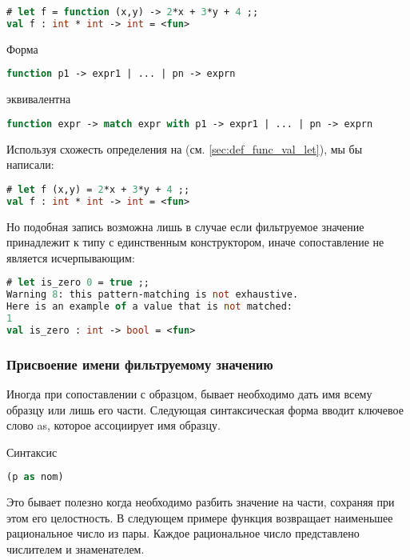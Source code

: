\begin{lstlisting}[language=OCaml]
# let f = function (x,y) -> 2*x + 3*y + 4 ;;
val f : int * int -> int = <fun>
\end{lstlisting}

Форма

\begin{lstlisting}[language=OCaml]
 function p1 -> expr1 | ... | pn -> exprn 
\end{lstlisting}

эквивалентна

\begin{lstlisting}[language=OCaml]
function expr -> match expr with p1 -> expr1 | ... | pn -> exprn
\end{lstlisting}

Используя схожесть определения на (см. \ref{sec:def_func_val_let}), мы бы
написали:

\begin{lstlisting}[language=OCaml]
# let f (x,y) = 2*x + 3*y + 4 ;;
val f : int * int -> int = <fun>
\end{lstlisting}

Но подобная запись возможна лишь в случае если фильтруемое значение принадлежит
к типу с единственным конструктором, иначе сопоставление не является
исчерпывающим:

\begin{lstlisting}[language=OCaml]
# let is_zero 0 = true ;;
Warning 8: this pattern-matching is not exhaustive.
Here is an example of a value that is not matched:
1
val is_zero : int -> bool = <fun>
\end{lstlisting}

\subsubsection{Присвоение имени фильтруемому значению}

Иногда при сопоставлении с образцом, бывает необходимо дать имя всему образцу
или лишь его части. Следующая синтаксическая форма вводит ключевое слово as,
которое ассоциирует имя образцу.

Синтаксис

\begin{lstlisting}[language=OCaml]
(p as nom)
\end{lstlisting}

Это бывает полезно когда необходимо разбить значение на части, сохраняя при этом
его целостность. В следующем примере функция возвращает наименьшее рациональное
число из пары. Каждое рациональное число представлено числителем и знаменателем.

